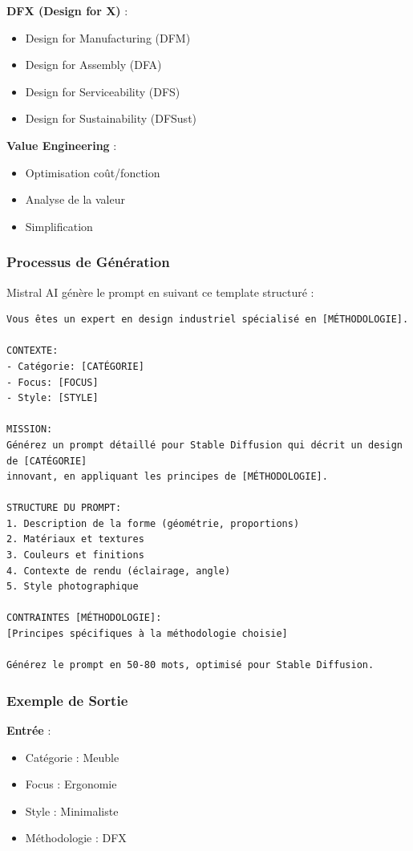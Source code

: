 \textbf{DFX (Design for X)} :
\begin{itemize}[leftmargin=*]
    \item Design for Manufacturing (DFM)
    \item Design for Assembly (DFA)
    \item Design for Serviceability (DFS)
    \item Design for Sustainability (DFSust)
\end{itemize}

\textbf{Value Engineering} :
\begin{itemize}[leftmargin=*]
    \item Optimisation coût/fonction
    \item Analyse de la valeur
    \item Simplification
\end{itemize}

\subsubsection{Processus de Génération}

Mistral AI génère le prompt en suivant ce template structuré :

\begin{lstlisting}[caption=Template de génération de prompt]
Vous êtes un expert en design industriel spécialisé en [MÉTHODOLOGIE].

CONTEXTE:
- Catégorie: [CATÉGORIE]
- Focus: [FOCUS]
- Style: [STYLE]

MISSION:
Générez un prompt détaillé pour Stable Diffusion qui décrit un design de [CATÉGORIE] 
innovant, en appliquant les principes de [MÉTHODOLOGIE].

STRUCTURE DU PROMPT:
1. Description de la forme (géométrie, proportions)
2. Matériaux et textures
3. Couleurs et finitions
4. Contexte de rendu (éclairage, angle)
5. Style photographique

CONTRAINTES [MÉTHODOLOGIE]:
[Principes spécifiques à la méthodologie choisie]

Générez le prompt en 50-80 mots, optimisé pour Stable Diffusion.
\end{lstlisting}

\subsubsection{Exemple de Sortie}

\textbf{Entrée} :
\begin{itemize}[leftmargin=*]
    \item Catégorie : Meuble
    \item Focus : Ergonomie
    \item Style : Minimaliste
    \item Méthodologie : DFX
\end{itemize}


